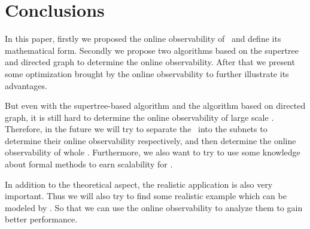 \section{Conclusions}
\label{sec:con}

In this paper, firstly we proposed the online observability of \BCNs\ and define its mathematical form. Secondly we propose two algorithms based on the supertree and directed graph to determine the online observability. After that we present some optimization brought by the online observability to further illustrate its advantages. %

But even with the supertree-based algorithm and the algorithm based on directed graph, it is still hard to determine the online observability of large scale \BCNs. Therefore, in the future we will try to separate the \BCN\ into the subnets to determine their online observability respectively, and then determine the online observability of whole \BCN. Furthermore, we also want to try to use some knowledge about formal methods to earn scalability for \BCNs. 

In addition to the theoretical aspect, the realistic application is also very important. Thus we will also try to find some realistic example which can be modeled by \BCNs. So that we can use the online observability to analyze them to gain better performance.